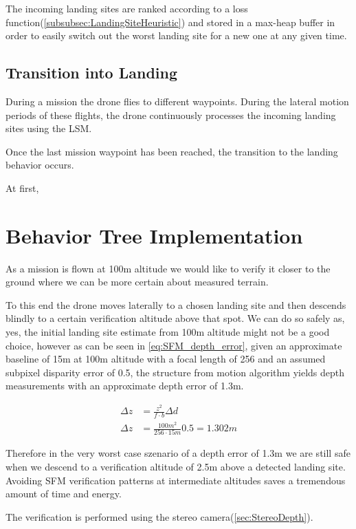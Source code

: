 The incoming landing sites are ranked according to a loss function(\ref{subsubsec:LandingSiteHeuristic}) and stored in a max-heap buffer in order to easily switch out the worst landing site for a new one at any given time.

\subsection{Transition into Landing}

During a mission the drone flies to different waypoints. During the lateral motion periods of these flights, the drone continuously processes the incoming landing sites using the LSM.

Once the last mission waypoint has been reached, the transition to the landing behavior occurs.

At first, 

\section{Behavior Tree Implementation}\label{subsec:behavior_tree}

As a mission is flown at 100m altitude we would like to verify it closer to the ground where we can be more certain about measured terrain.

To this end the drone moves laterally to a chosen landing site and then descends blindly to a certain verification altitude above that spot. We can do so safely as, yes, the initial landing site estimate from 100m altitude might not be a good choice, however as can be seen in \cref{eq:SFM_depth_error}, given an approximate baseline of 15m at 100m altitude with a focal length of 256 and an assumed subpixel disparity error of 0.5, the structure from motion algorithm yields depth measurements with an approximate depth error of 1.3m.

\begin{align}
    {\Delta z} &= \frac{z^2}{f  \cdot b}\Delta d\\
    {\Delta z} &= \frac{100m^2}{256  \cdot 15m}0.5 = 1.302m
    \label{eq:SFM_depth_error}
\end{align}

Therefore in the very worst case szenario of a depth error of 1.3m we are still safe when we descend to a verification altitude of 2.5m above a detected landing site. Avoiding SFM verification patterns at intermediate altitudes saves a tremendous amount of time and energy.

The verification is performed using the stereo camera(\ref{sec:StereoDepth}).



